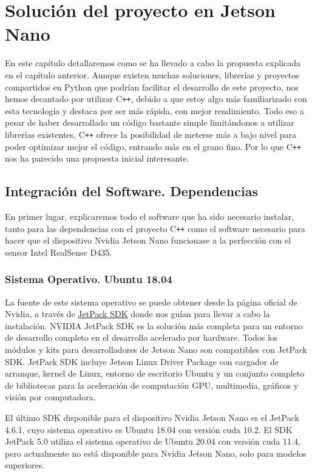 \chapter{Solución del proyecto en Jetson Nano}
\label{cap:solucion-proyecto}

En este capítulo detallaremos como se ha llevado a cabo la propuesta explicada en el capítulo anterior.
Aunque existen muchas soluciones, librerías y proyectos compartidos en Python que podrían facilitar el desarrollo de este proyecto, nos hemos decantado por utilizar C\texttt{++}, debido a que estoy algo más familiarizado con esta tecnología y destaca por ser más rápida, con mejor rendimiento.
Todo eso a pesar de haber desarrollado un código bastante simple limitándonos a utilizar librerías existentes, C\texttt{++} ofrece la posibilidad de meterse más a bajo nivel para poder optimizar mejor el código, entrando más en el grano fino. Por lo que C\texttt{++} nos ha parecido una propuesta inicial interesante.

\section{Integración del Software. Dependencias}

En primer lugar, explicaremos todo el software que ha sido necesario instalar, tanto para las dependencias con el proyecto C\texttt{++} como el software necesario para hacer que el dispositivo Nvidia Jetson Nano funcionase a la perfección con el sensor Intel RealSense D435.

\subsection{Sistema Operativo. Ubuntu 18.04}

La fuente de este sistema operativo se puede obtener desde la página oficial de Nvidia, a través de \href{https://developer.nvidia.com/embedded/jetpack}{JetPack SDK} donde nos guían para llevar a cabo la instalación.
NVIDIA JetPack SDK es la solución más completa para un entorno de desarrollo completo en el desarrollo acelerado por hardware. Todos los módulos y kits para desarrolladores de Jetson Nano son compatibles con JetPack SDK.
JetPack SDK incluye Jetson Linux Driver Package con cargador de arranque, kernel de Linux, entorno de escritorio Ubuntu y un conjunto completo de bibliotecas para la aceleración de computación GPU, multimedia, gráficos y visión por computadora.

El último SDK disponible para el dispositivo Nvidia Jetson Nano es el JetPack 4.6.1, cuyo sistema operativo es Ubuntu 18.04 con versión \gls{cuda} 10.2.
El SDK JetPack 5.0 utiliza el sistema operativo de Ubuntu 20.04 con versión \gls{cuda} 11.4, pero actualmente no está disponible para Nvidia Jetson Nano, solo para modelos superiores.

